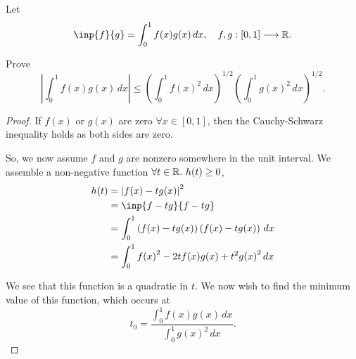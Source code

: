 \documentclass{article}
\begin{document}
\begin{problem}
Let \[
	\inp{f }{g }=\int_{0}^{1} f(x)g(x)\, dx,\quad f,g:[0,1]\longrightarrow\R
	.\]

Prove \[
	\left| \int_{0}^{1} f(x)g(x)\,dx \right| \le {\left( \int_{0}^{1} {f(x)}^2\,dx  \right) }^{1 / 2}{\left( \int_{0}^{1} {g(x)}^2\,dx  \right) }^{1/2}
	.\]
\end{problem}
\begin{proof}
	If $f(x)$ or $g(x)$ are zero $\forall x\in [0,1]$, then the Cauchy-Schwarz inequality holds as both sides are zero.

	So, we now assume $f$ and  $g$ are nonzero somewhere in the unit interval. We assemble a non-negative function  $\forall t\in \mathbb{R}.\ h(t)\ge 0$,
	\begin{align*}
		h(t) & = {|f(x)-tg(x)|}^2                                                    \\
		     & = \inp{f-tg}{f-tg}                                                    \\
		     & = \int_{0}^{1} \left( f(x)-tg(x) \right)\left( f(x)-tg(x) \right)\,dx \\
		     & = \int_{0}^{1} {f(x)}^2-2tf(x)g(x)+t^2{g(x)}^2\,dx                    \\
	\end{align*}

	We see that this function is a quadratic in $t$. We now wish to find the minimum value of this function, which occurs at  \[
		t_0=\frac{\int_{0}^{1} f(x)g(x)\,dx }{\int_{0}^{1} {g(x)}^2\,dx }
		.\]
\end{proof}
\end{document}
